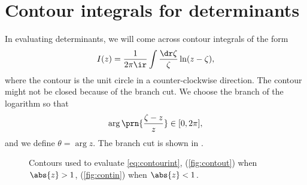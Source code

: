 \documentclass[12pt]{article}
\begin{document}
\section{Contour integrals for determinants}\label{sec:contourints}

In evaluating determinants, we will come across contour integrals of the form
%
\begin{equation}\label{eq:contourint}
  I(z) = \frac{1}{2\pi\ir}\int \frac{\dr\zeta}{\zeta} \ln(z-\zeta),
\end{equation}
%
where the contour is the unit circle in a counter-clockwise direction.
The contour might not be closed because of the branch cut.
We choose the branch of the logarithm so that
%
\begin{equation}\label{eq:branch}
  \arg\prn{\frac{\zeta-z}{z}} \in [0,2\pi],
\end{equation}
%
and we define $\theta=\arg z$. The branch cut is shown in .

\begin{figure}
 \begin{center}
 \begin{myenuma}
  \item{}\label{fig:contout}
  \hspace{1cm}
  \item{}\label{fig:contin}
 \end{myenuma}
 \end{center}
  \caption{Contours used to evaluate \eqref{eq:contourint}, (\ref{fig:contout}) when $\abs{z}>1$, (\ref{fig:contin}) when $\abs{z}<1$.}\label{fig:contours}
\end{figure}
\end{document}
